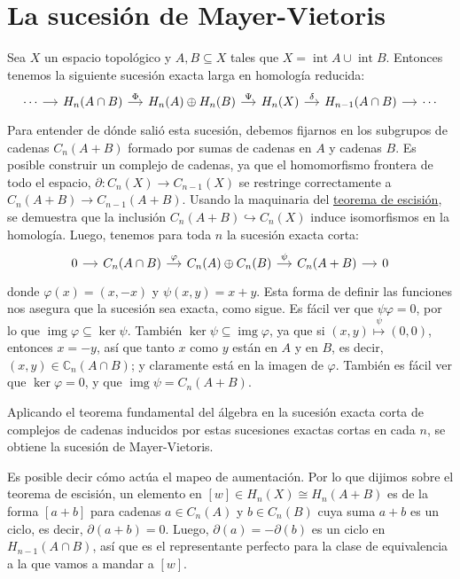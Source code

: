 \documentclass[spanish]{book}
\theoremstyle{definition}
\newcommand{\C}{\mathbb{C}}
\DeclareMathOperator{\img}{img}
\DeclareMathOperator{\Int}{int}
\begin{document}
\section{La sucesión de Mayer-Vietoris}
	Sea $X$ un espacio topológico y $A,B\subseteq X$ tales que $X=\Int A\cup \Int B$. Entonces tenemos la siguiente sucesión exacta larga en homología reducida:
	\[\begin{tikzcd}[column sep= small]
		\cdots \arrow[r] & H_n(A\cap B) \arrow[r,"\Phi"] & H_n(A) \oplus H_n(B) \arrow[r,"\Psi"] & H_n(X) \arrow[r,"\delta"] & H_{n-1}(A\cap B) \arrow[r] &\cdots
	\end{tikzcd}\]
	Para entender de dónde salió esta sucesión, debemos fijarnos en los subgrupos de cadenas $C_n(A+B)$ formado por sumas de cadenas en $A$ y cadenas $B$. Es posible construir un complejo de cadenas, ya que el homomorfismo frontera de todo el espacio, $\partial:C_n(X)\to C_{n-1}(X)$ se restringe correctamente a $C_n(A+B)\to C_{n-1}(A+B)$. Usando la maquinaria del \hyperref[sec:escisión]{teorema de escisión}, se demuestra que la inclusión $C_n(A+B)\hookrightarrow C_n(X)$ induce isomorfismos en la homología. Luego, tenemos para toda $n$ la sucesión exacta corta:
	\[\begin{tikzcd}[column sep=small]
		0\arrow[r]&C_n(A\cap B)\arrow[r,"\varphi"]&C_n(A)\oplus C_n(B)\arrow[r,"\psi"]&C_n(A+B)\arrow[r]&0
	\end{tikzcd}\]
	donde $\varphi(x)=(x,-x)$ y $\psi(x,y)=x+y$. Esta forma de definir las funciones nos asegura que la sucesión sea exacta, como sigue. Es fácil ver que $\psi\varphi=0$, por lo que $\img\varphi\subseteq\ker\psi$. También $\ker\psi\subseteq\img\varphi$, ya que si $(x,y)\overset{\psi}{\mapsto}(0,0)$, entonces $x=-y$, así que tanto $x$ como $y$ están en $A$ y en $B$, es decir, $(x,y)\in\C_n(A\cap B)$; y  claramente está en la imagen de $\varphi$. También es fácil ver que $\ker\varphi=0$, y que $\img\psi=C_n(A+B)$.
	
	Aplicando el teorema fundamental del álgebra en la sucesión exacta corta de complejos de cadenas inducidos por estas sucesiones exactas cortas en cada $n$, se obtiene la sucesión de Mayer-Vietoris.
	
	Es posible decir cómo actúa el mapeo de aumentación. Por lo que dijimos sobre el teorema de escisión, un elemento en $[w]\in H_n(X)\cong H_n(A+B)$ es de la forma $[a+b]$ para cadenas $a\in C_n(A)$ y $b\in C_n(B)$ cuya suma $a+b$ es un ciclo, es decir, $\partial(a+b)=0$. Luego, $\partial(a)=-\partial(b)$ es un ciclo en $H_{n-1}(A\cap B)$, así que es el representante perfecto para la clase de equivalencia a la que vamos a mandar a $[w]$.
	
\end{document}
